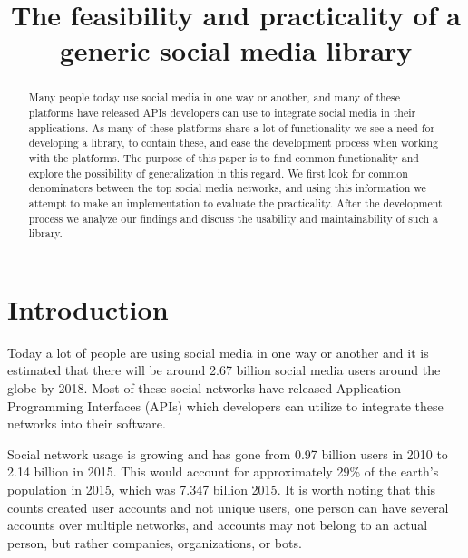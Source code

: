 \documentclass{sigchi-alternate}
\begin{document}

\title{The feasibility and practicality of a generic social media library}

\author{
}

\maketitle

\begin{abstract}
Many people today use social media in one way or another, and many of these platforms have released APIs developers can use to integrate social media
in their applications. As many of these platforms share a lot of functionality we see a need for developing a library, to contain these, and ease the
development process when working with the platforms. The purpose of this paper is to find common functionality and explore the possibility of generalization
in this regard. We first look for common denominators between the top social media networks, and using this information we attempt to make an implementation
to evaluate the practicality. After the development process we analyze our findings and discuss the usability and maintainability of such a library.
\end{abstract}

\section{Introduction}
Today a lot of people are using social media in one way or another and it is estimated that there will be around 2.67 billion social media
users around the globe by 2018\autocite{STATISTA_SN_WORLD_USERS}. Most of these social networks have released Application Programming Interfaces (APIs)
which developers can utilize to integrate these networks into their software.

Social network usage is growing and has gone from 0.97 billion users in 2010 to 2.14 billion in 2015\autocite{STATISTA_SN_WORLD_USERS}. This would
account for approximately 29\% of the earth's population in 2015, which was 7.347 billion 2015\autocite{WORLD_BANK_POPULATION}. It is worth noting
that this counts created user accounts and not unique users, one person can have several accounts over multiple networks, and accounts may not
belong to an actual person, but rather companies, organizations, or bots.
\end{document}
